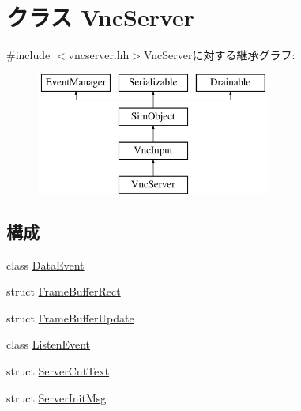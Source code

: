 \hypertarget{classVncServer}{
\section{クラス VncServer}
\label{classVncServer}
}


{\ttfamily \#include $<$vncserver.hh$>$}VncServerに対する継承グラフ:\begin{figure}[H]
\begin{center}
\leavevmode
\includegraphics[height=4cm]{classVncServer}
\end{center}
\end{figure}
\subsection*{構成}
\begin{DoxyCompactItemize}
\item 
class \hyperlink{classVncServer_1_1DataEvent}{DataEvent}
\item 
struct \hyperlink{structVncServer_1_1FrameBufferRect}{FrameBufferRect}
\item 
struct \hyperlink{structVncServer_1_1FrameBufferUpdate}{FrameBufferUpdate}
\item 
class \hyperlink{classVncServer_1_1ListenEvent}{ListenEvent}
\item 
struct \hyperlink{structVncServer_1_1ServerCutText}{ServerCutText}
\item 
struct \hyperlink{structVncServer_1_1ServerInitMsg}{ServerInitMsg}
\end{DoxyCompactItemize}
